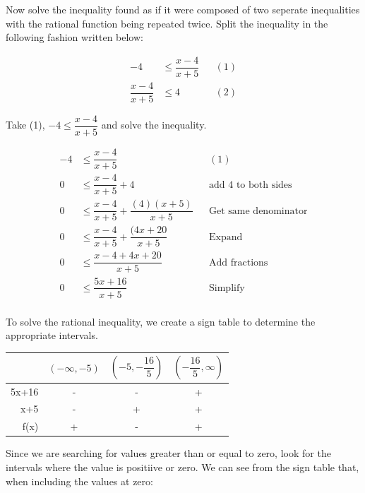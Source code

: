 \documentclass[12pt]{book}
\begin{document}
\begin{enumerate}
Now solve the inequality found as if it were composed of two seperate inequalities with the rational function being repeated twice. Split the inequality in the following fashion written below:

\begin{align*}
    -4 &\le \dfrac{x-4}{x+5} && (1)\\
    \dfrac{x-4}{x+5} &\le 4 && (2)
\end{align*}

\vspace{1cm}

Take (1), $-4 \le \dfrac{x-4}{x+5}$ and solve the inequality.

\begin{align*}
    -4 &\le \dfrac{x-4}{x+5} && (1)\\
    0 &\le \dfrac{x-4}{x+5} + 4 && \text{add 4 to both sides} \\
    0 &\le \dfrac{x-4}{x+5} + \dfrac{(4)(x+5)}{x+5} && \text{Get same denominator} \\
    0 &\le \dfrac{x-4}{x+5} + \dfrac{(4x+20}{x+5} && \text{Expand} \\
    0 &\le \dfrac{x-4+4x+20}{x+5} && \text{Add fractions} \\
    0 &\le \dfrac{5x+16}{x+5} && \text{Simplify} \\
\end{align*}

\newpage

\begin{center}
To solve the rational inequality, we create a sign table
 to determine the appropriate intervals.
\end{center}
\vspace{0.5cm}

\begin{center}
    \begin{tabular}{|r|c|c|c|}
        \hline
        & $(-\infty, -5)$ & $\left(-5, -\dfrac{16}{5} \right)$ & $\left( -\dfrac{16}{5}, \infty \right)$ \\ \hline
        5x+16 & - & - & + \\ \hline
        x+5 & - & + & + \\ \hline
        f(x) & + & - & + \\ \hline
    \end{tabular}
\end{center}

\vspace{0.3cm}

Since we are searching for values greater than or equal to zero,
 look for the intervals where the value is positiive or zero. We can see
  from the sign table that, when including the values at zero:


\end{enumerate}
\end{document}
